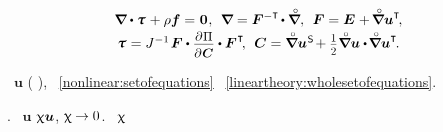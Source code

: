 \begin{minipage}{\linewidth}
\begin{itemize}
{{\nopagebreak\vspace{-0.25em}
\begin{equation}\label{nonlinear:setofequations}
\begin{array}{c}
\boldnabla \dotp \cauchystress \hspace{.15ex} + \rho \bm{f} = \hspace{.1ex} \bm{0} \hspace{.1ex},
\:\:
\boldnabla = \bm{F}^{-\T} \hspace{-0.2ex} \dotp \boldnablacircled ,
\:\:
\bm{F} = \UnitDyad \hspace{.1ex} + \hspace{-0.2ex} \boldnablacircled {\bm{u}}^{\T} \hspace{-0.3ex},
\\[.2em]
%
\cauchystress \hspace{.1ex} = J^{-1} \hspace{.2ex} \bm{F} \dotp \scalebox{0.9}{$ \displaystyle \frac{\raisemath{-0.125em}{\partial\hspace{.1ex} \potential}}{\raisemath{-0.1em}{\partial\hspace{.1ex} \bm{C}}} $} \dotp \bm{F}^{\hspace{.1ex}\T} \hspace{-0.4ex},
\:\:
\bm{C} = \boldnablacircled {\bm{u}}^{\hspace{.1ex}\mathsf{S}} \hspace{-0.3ex} + \smalldisplaystyleonehalf \boldnablacircled \bm{u} \dotp \hspace{-0.25ex} \boldnablacircled \bm{u}^{\T} \hspace{-0.25ex}.
\end{array}
\end{equation}

\vspace{-0.1em}\noindent
{}
~$\bm{u}$
(  ),
~\eqref{nonlinear:setofequations}
~\eqref{lineartheory:wholesetofequations}.

.
~$\bm{u}$
 $\upchi \bm{u}$,
${\upchi \hspace{-0.1ex}\to 0}$.
~$\upchi$

}}
\end{itemize}
\end{minipage}
